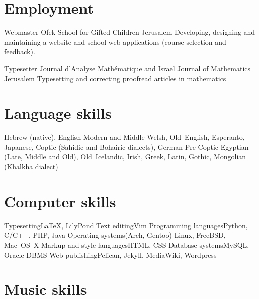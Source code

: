 \section{Employment}

	{Webmaster}
	{Ofek School for Gifted Children}
	{Jerusalem}
	{}
	{Developing, designing and maintaining a website and school web applications (course selection and feedback).}

	{Typesetter}
	{Journal d'Analyse Mathématique and Israel Journal of Mathematics}
	{Jerusalem}
	{}
	{Typesetting and correcting proofread articles in mathematics}



\section{Language skills}

	{Hebrew (native), English}
	{Modern and Middle Welsh, Old~English, Esperanto, Japanese, Coptic (Sahidic and Bohairic dialects), German}
	{Pre-Coptic Egyptian (Late, Middle and Old), Old~Icelandic, Irish, Greek, Latin, Gothic, Mongolian (Khalkha dialect)}



\section{Computer skills}

\cvdoubleitem
	{Typesetting}{{\texfont\LaTeX}, LilyPond}
	{Text editing}{Vim}
\cvdoubleitem
	{Programming languages}{Python, C/C++, PHP, Java}
	{Operating systems}{(Arch, Gentoo) Linux, FreeBSD, Mac~OS~X}
\cvdoubleitem
	{Markup and style languages}{HTML, CSS}
	{Database systems}{MySQL, Oracle DBMS}
\cvdoubleitem
	{Web publishing}{Pelican, Jekyll, MediaWiki, Wordpress}
	{}{}



\section{Music skills}



